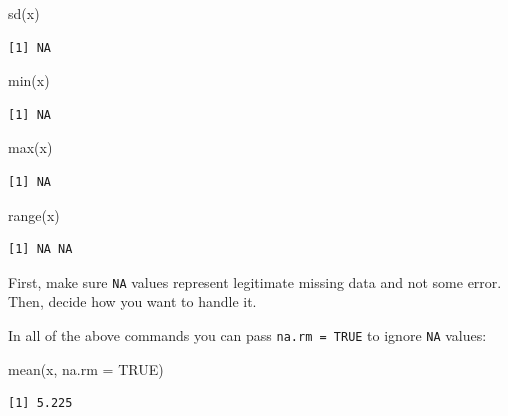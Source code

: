\documentclass[
]{book}
\newenvironment{Shaded}{\begin{snugshade}}{\end{snugshade}}
\newcommand{\AttributeTok}[1]{\textcolor[rgb]{0.77,0.63,0.00}{#1}}
\newcommand{\ConstantTok}[1]{\textcolor[rgb]{0.00,0.00,0.00}{#1}}
\newcommand{\FunctionTok}[1]{\textcolor[rgb]{0.00,0.00,0.00}{#1}}
\newcommand{\NormalTok}[1]{#1}
\begin{document}
\begin{Shaded}
\begin{Highlighting}[]
\FunctionTok{sd}\NormalTok{(x)}
\end{Highlighting}
\end{Shaded}

\begin{verbatim}
[1] NA
\end{verbatim}

\begin{Shaded}
\begin{Highlighting}[]
\FunctionTok{min}\NormalTok{(x)}
\end{Highlighting}
\end{Shaded}

\begin{verbatim}
[1] NA
\end{verbatim}

\begin{Shaded}
\begin{Highlighting}[]
\FunctionTok{max}\NormalTok{(x)}
\end{Highlighting}
\end{Shaded}

\begin{verbatim}
[1] NA
\end{verbatim}

\begin{Shaded}
\begin{Highlighting}[]
\FunctionTok{range}\NormalTok{(x)}
\end{Highlighting}
\end{Shaded}

\begin{verbatim}
[1] NA NA
\end{verbatim}

First, make sure \texttt{NA} values represent legitimate missing data and not some error.\\
Then, decide how you want to handle it.

In all of the above commands you can pass \texttt{na.rm\ =\ TRUE} to ignore \texttt{NA} values:

\begin{Shaded}
\begin{Highlighting}[]
\FunctionTok{mean}\NormalTok{(x, }\AttributeTok{na.rm =} \ConstantTok{TRUE}\NormalTok{)}
\end{Highlighting}
\end{Shaded}

\begin{verbatim}
[1] 5.225
\end{verbatim}
\end{document}
